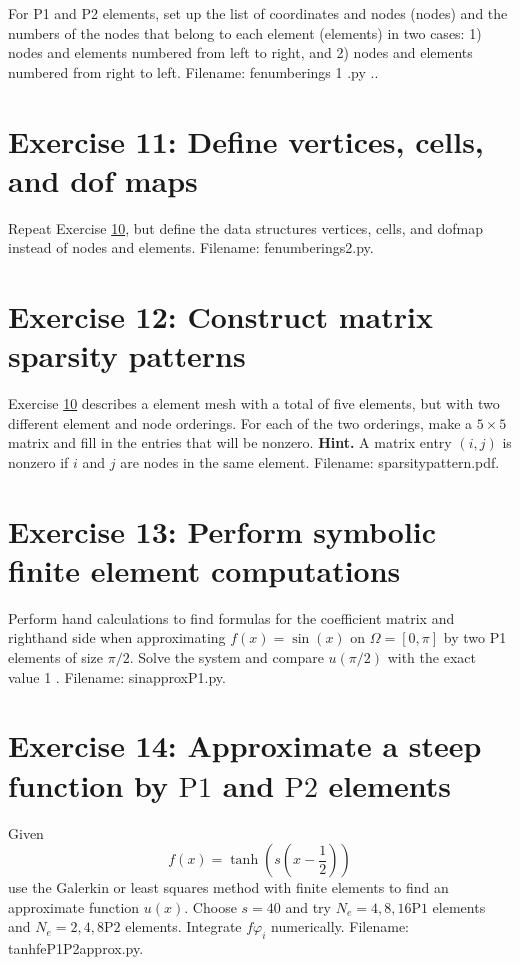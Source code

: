 \documentclass[../main.tex]{subfiles}
\begin{document}
	For P1 and P2 elements, set up the list of coordinates and nodes (nodes) and the numbers of the nodes that belong to each element (elements) in two cases: 1) nodes and elements numbered from left to right, and 2) nodes and elements numbered from right to left. Filename: fe\textunderscore numberings 1 .py ..
	\bigbreak
	\section*{Exercise 11: Define vertices, cells, and dof maps}
	\label{sec:sec_10_11}
	\noindent Repeat Exercise \hyperref[sec:sec_10_10]{10}, but define the data structures vertices, cells, and dof\textunderscore map instead of nodes and elements. Filename: fe\textunderscore numberings2.py.
	\bigbreak
	\section*{Exercise 12: Construct matrix sparsity patterns}
	\label{sec:sec_10_12}
	\noindent Exercise \hyperref[sec:sec_10_10]{10} describes a element mesh with a total of five elements, but with two different element and node orderings. For each of the two orderings, make a $5 \times 5$ matrix and fill in the entries that will be nonzero.
	\bigbreak
	\noindent \textbf{Hint.} A matrix entry $(i, j)$ is nonzero if $i$ and $j$ are nodes in the same element. Filename: \textunderscore sparsity\textunderscore pattern.pdf.
	
	\section*{Exercise 13: Perform symbolic finite element computations}
	\label{sec:sec_10_13}
	\noindent Perform hand calculations to find formulas for the coefficient matrix and righthand side when approximating $f(x)=\sin (x)$ on $\Omega=[0, \pi]$ by two P1 elements of size $\pi / 2$. Solve the system and compare $u(\pi / 2)$ with the exact value 1 .
	Filename: sin\textunderscore approx\textunderscore P1.py.
	\bigbreak
	\section*{Exercise 14: Approximate a steep function by $\mathrm{P} 1$ and $\mathrm{P} 2$ elements}
	\label{sec:sec_10_14}
	\noindent Given
	$$
	f(x)=\tanh \left(s\left(x-\frac{1}{2}\right)\right)
	$$
	use the Galerkin or least squares method with finite elements to find an approximate function $u(x)$. Choose $s=40$ and try $N_{e}=4,8,16 \mathrm{P} 1$ elements and $N_{e}=2,4,8 \mathrm{P} 2$ elements. Integrate $f \varphi_{i}$ numerically. Filename: tanh\textunderscore fe\textunderscore P1P2\textunderscore approx.py.
	\bigbreak
\end{document}
